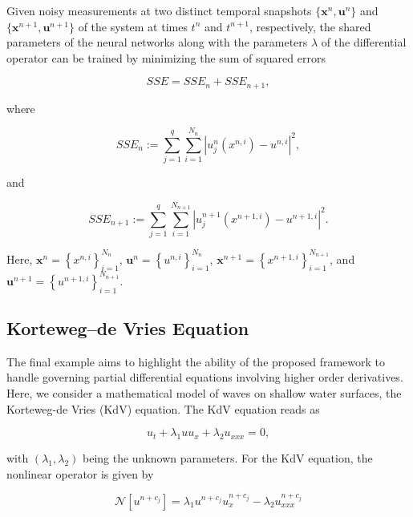 \documentclass[book.tex]{subfiles}
\begin{document}
Given noisy measurements at two distinct temporal snapshots $\{\mathbf{x}^{n}, \mathbf{u}^{n}\}$ and $\{\mathbf{x}^{n+1}, \mathbf{u}^{n+1}\}$ of the system at times $t^{n}$ and $t^{n+1}$, respectively, the shared parameters of the neural networks along with the parameters $\lambda$ of the differential operator can be trained by minimizing the sum of squared errors

\begin{equation}
SSE = SSE_n + SSE_{n+1},    
\end{equation}



where

\begin{equation}
SSE_n := \sum_{j=1}^q \sum_{i=1}^{N_n} |u^n_j(x^{n,i}) - u^{n,i}|^2,    
\end{equation}



and

\begin{equation}
SSE_{n+1} := \sum_{j=1}^q \sum_{i=1}^{N_{n+1}} |u^{n+1}_j(x^{n+1,i}) - u^{n+1,i}|^2.    
\end{equation}



Here, $\mathbf{x}^n = \left\{x^{n,i}\right\}_{i=1}^{N_n}$, $\mathbf{u}^n = \left\{u^{n,i}\right\}_{i=1}^{N_n}$, $\mathbf{x}^{n+1} = \left\{x^{n+1,i}\right\}_{i=1}^{N_{n+1}}$, and $\mathbf{u}^{n+1} = \left\{u^{n+1,i}\right\}_{i=1}^{N_{n+1}}$.


\subsection{Korteweg–de Vries Equation}

The final example aims to highlight the ability of the proposed framework to handle governing partial differential equations involving higher order derivatives. Here, we consider a mathematical model of waves on shallow water surfaces, the Korteweg-de Vries (KdV) equation. The KdV equation reads as

\begin{equation}
u_t + \lambda_1 u u_x + \lambda_2 u_{xxx} = 0,    
\end{equation}

with $(\lambda_1, \lambda_2)$ being the unknown parameters. For the KdV equation, the nonlinear operator is given by

\begin{equation}
\mathcal{N}[u^{n+c_j}] = \lambda_1 u^{n+c_j} u^{n+c_j}_x - \lambda_2 u^{n+c_j}_{xxx}    
\end{equation}
\end{document}
